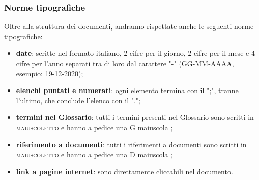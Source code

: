 	\subsubsection{Norme tipografiche}
	Oltre alla struttura dei documenti, andranno rispettate anche le seguenti norme tipografiche:
	\begin{itemize}
		\item \textbf{date}: scritte nel formato italiano, 2 cifre per il giorno, 2 cifre per il mese e 4 cifre per l'anno separati tra di loro dal carattere "-" (GG-MM-AAAA, esempio: 19-12-2020);
		\item \textbf{elenchi puntati e numerati}: ogni elemento termina con il ";", tranne l'ultimo, che conclude l'elenco con il ".";
		\item \textbf{termini nel Glossario}: tutti i termini presenti nel Glossario sono scritti in \textsc{maiuscoletto} e hanno a pedice una G maiuscola \glock{};
		\item \textbf{riferimento a documenti}: tutti i riferimenti a documenti sono scritti in \textsc{maiuscoletto} e hanno a pedice una D maiuscola \dext{};
		\item \textbf{link a pagine internet}: sono direttamente cliccabili nel documento.
	\end{itemize}

